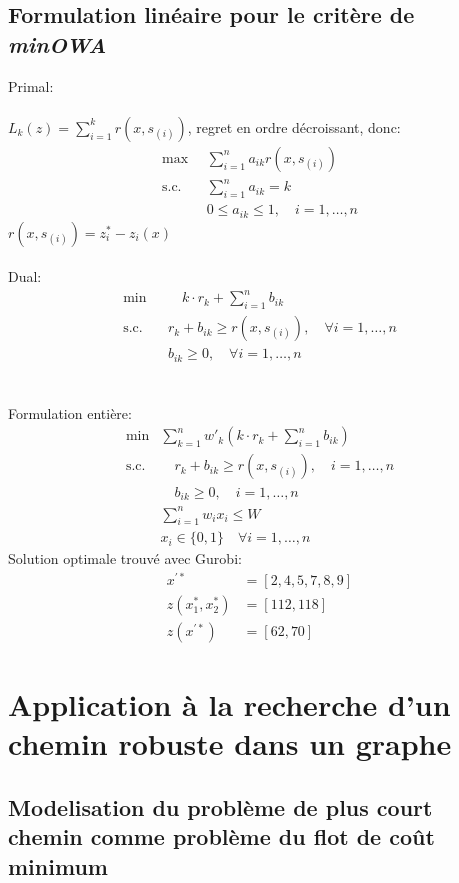 \documentclass[10pt,a4paper]{report}
\begin{document}
\section{Formulation linéaire pour le critère de \textit{minOWA}}
Primal:\\\\
$L_k(z)=\sum_{i=1}^{k} r(x,s_{(i)})$, regret en ordre décroissant, donc:\\
\begin{align*}
    \max &\sum_{i=1}^n a_{ik} r(x,s_{(i)})\\
\text{s.c.} \quad & \sum_{i=1}^{n} a_{ik} = k \\
& 0 \leq a_{ik} \leq 1, \quad i = 1, \dots, n
\end{align*}
$r(x,s_{(i)}) = z_i^*-z_i(x)$\\\\
Dual:
\begin{align*}
\min & \quad k \cdot r_k + \sum_{i=1}^{n} b_{ik} \\
\text{s.c.} \quad & r_k + b_{ik} \geq r(x,s_{(i)}), \quad \forall i = 1, \dots, n \\
& b_{ik} \geq 0, \quad \forall i = 1, \dots, n
\end{align*}\\\\
Formulation entière:
\begin{align*}
\min &\sum_{k=1}^n w'_k \left( k \cdot r_k + \sum_{i=1}^n b_{ik} \right) \\
\text{s.c.} & \quad r_k + b_{ik} \geq r(x,s_{(i)}), \quad i = 1, \dots, n \\
& \quad b_{ik} \geq 0, \quad i = 1, \dots, n \\
& \sum_{i=1}^{n} w_i x_i \leq W\\
&x_i\in\{0,1\}\quad \forall i=1, \dots,n
\end{align*}
Solution optimale trouvé avec Gurobi:
\begin{align*}
	x^{'*} 	&= [2, 4, 5, 7, 8, 9]\\
	z(x_1^*,x_2^*) &= [112,118]\\ 
	z(x^{'*}) 	&= [62,70]
\end{align*}
\chapter{Application à la recherche d’un chemin robuste dans un graphe}
\section{Modelisation du problème de plus court chemin comme problème du flot de coût minimum}
\end{document}
